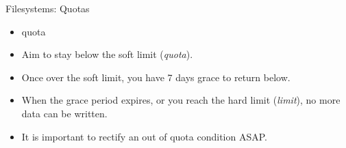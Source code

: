 \begin{frame}[fragile]{Filesystems: Quotas}
\begin{itemize}
\item{quota}
\item<1-|handout:1->{\alert{Aim to stay below the soft limit (\emph{quota}).}}
\item<2-|handout:1->{\alert{Once over the soft limit, you have 7 days grace to return below.}}
\item<3-|handout:2>{\alert{When the grace period expires, or you reach the hard limit (\emph{limit}), no more data can be written.}}
\item<4-|handout:2>{\alert{It is important to rectify an out of quota condition ASAP.}}
\end{itemize}
\end{frame}


